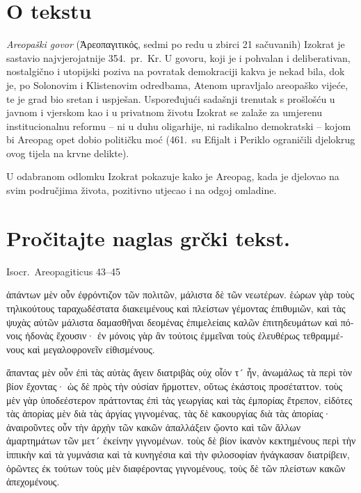 


\section*{O tekstu}

\textit{Areopaški govor} (Ἀρεοπαγιτικός, sedmi po redu u zbirci 21 sačuvanih) Izokrat je sastavio najvjerojatnije 354.\ pr.~Kr. U govoru, koji je i pohvalan i deliberativan, nostalgično i utopijski poziva na povratak demokraciji kakva je nekad bila, dok je, po Solonovim i Klistenovim odredbama, Atenom upravljalo areopaško vijeće, te je grad bio sretan i uspješan. Uspoređujući sadašnji trenutak s prošlošću u javnom i vjerskom kao i u privatnom životu Izokrat se zalaže za umjerenu institucionalnu reformu – ni u duhu oligarhije, ni radikalno demokratski – kojom bi Areopag opet dobio političku moć (461.\ su Efijalt i Periklo ograničili djelokrug ovog tijela na krvne delikte).

U odabranom odlomku Izokrat pokazuje kako je Areopag, kada je djelovao na svim područjima života, pozitivno utjecao i na odgoj omladine.


\section*{Pročitajte naglas grčki tekst.}

Isocr.\ Areopagiticus 43–45


\medskip


{\large

\begin{greek}

\noindent  ἁπάντων μὲν οὖν ἐφρόντιζον τῶν πολιτῶν, μάλιστα δὲ τῶν νεωτέρων. ἑώρων γὰρ τοὺς τηλικούτους ταραχωδέστατα διακειμένους καὶ πλείστων γέμοντας ἐπιθυμιῶν, καὶ τὰς ψυχὰς αὐτῶν μάλιστα δαμασθῆναι δεομένας ἐπιμελείαις καλῶν ἐπιτηδευμάτων καὶ πόνοις ἡδονὰς ἔχουσιν· ἐν μόνοις γὰρ ἂν τούτοις ἐμμεῖναι τοὺς ἐλευθέρως τεθραμμένους καὶ μεγαλοφρονεῖν εἰθισμένους.

\noindent  ἅπαντας μὲν οὖν ἐπὶ τὰς αὐτὰς ἄγειν διατριβὰς οὐχ οἷόν τ´ ἦν, ἀνωμάλως τὰ περὶ τὸν βίον ἔχοντας· ὡς δὲ πρὸς τὴν οὐσίαν ἥρμοττεν, οὕτως ἑκάστοις προσέταττον. τοὺς μὲν γὰρ ὑποδεέστερον πράττοντας ἐπὶ τὰς γεωργίας καὶ τὰς ἐμπορίας ἔτρεπον, εἰδότες τὰς ἀπορίας μὲν διὰ τὰς ἀργίας γιγνομένας, τὰς δὲ κακουργίας διὰ τὰς ἀπορίας· ἀναιροῦντες οὖν τὴν ἀρχὴν τῶν κακῶν ἀπαλλάξειν ᾤοντο καὶ τῶν ἄλλων ἁμαρτημάτων τῶν μετ´ ἐκείνην γιγνομένων. τοὺς δὲ βίον ἱκανὸν κεκτημένους περὶ τὴν ἱππικὴν καὶ τὰ γυμνάσια καὶ τὰ κυνηγέσια καὶ τὴν φιλοσοφίαν ἠνάγκασαν διατρίβειν, ὁρῶντες ἐκ τούτων τοὺς μὲν διαφέροντας γιγνομένους, τοὺς δὲ τῶν πλείστων κακῶν ἀπεχομένους.
\end{greek}

}

